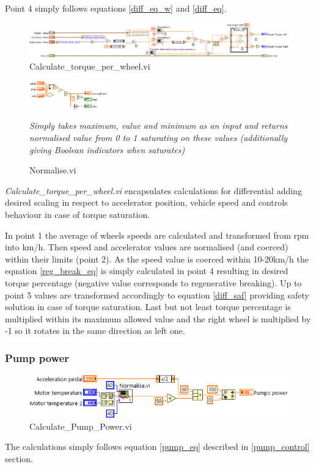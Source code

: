 Point 4 simply follows equations \ref{diff_eq_w} and \ref{diff_eq}.

\begin{figure}[H]
    \centering
    \includegraphics[scale=\visc,max width=\textwidth]{figures/Calculate_torque_per_wheeld}
    \caption{Calculate\_torque\_per\_wheel.vi}
    \label{vi:Calculate_torque_per_wheel}
\end{figure}

\begin{figure}
    \centering
    \includegraphics[scale=\visc,max width=0.3\textwidth]{figures/Normalised}
    \caption{Normalise.vi}
    \label{vi:Normalise}
    \medskip
    \small
    \textit{Simply takes maximum, value and minimum as an input and returns normalised value from 0 to 1 saturating on these values (additionally giving Boolean indicators when saturates)}
\end{figure}
\textit{Calculate\_torque\_per\_wheel.vi} encapsulates calculations for differential adding desired scaling in respect to accelerator position, vehicle speed and controls behaviour in case of torque saturation.

In point 1 the average of wheels speeds are calculated and transformed from rpm into km/h. Then speed and accelerator values are normalised (and coerced) within their limits (point 2). As the speed value is coerced within 10-20km/h the equation \ref{reg_break_eq} is simply calculated in point 4 resulting in desired torque percentage (negative value corresponds to regenerative breaking). Up to point 5 values are transformed accordingly to equation \ref{diff_saf} providing safety solution in case of torque saturation. Last but not least torque percentage is multiplied within its maximum allowed value and the right wheel is multiplied by -1 so it rotates in the same direction as left one.

\subsubsection{Pump power}
\begin{figure}[H]
    \centering
    \includegraphics[scale=\visc,max width=\textwidth]{figures/Calculate_Pump_Powerd}
    \caption{Calculate\_Pump\_Power.vi}
    \label{vi:Calculate_Pump_Power}
\end{figure}
The calculations simply follows equation \ref{pump_eq} described in \ref{pump_control} section.

